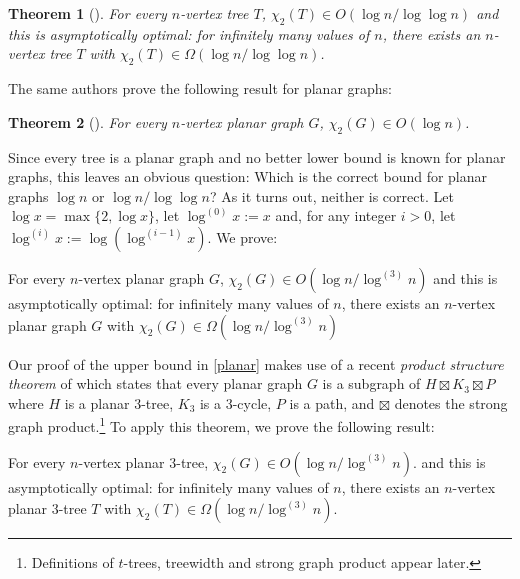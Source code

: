 \documentclass[kpfonts]{patmorin}
\newcommand{\uqs}{\chi_2}
\newtheorem{othertheorem}{Theorem}
\theoremstyle{named}
\begin{document}
\setcounter{othertheorem}{19}
\begin{othertheorem}[\cite{karpas.neiman.ea:on}]\label{trees}
    For every $n$-vertex tree $T$, $\uqs(T)\in O(\log n/\log\log n)$ and this is asymptotically optimal: for infinitely many values of $n$, there exists an $n$-vertex tree $T$ with $\uqs(T)\in\Omega(\log n/\log\log n)$.
\end{othertheorem}

The same authors prove the following result for planar graphs:

\setcounter{othertheorem}{15}
\begin{othertheorem}[\cite{karpas.neiman.ea:on}]\label{planar-graphs}
    For every $n$-vertex planar graph $G$, $\uqs(G)\in O(\log n)$.
\end{othertheorem}

Since every tree is a planar graph and no better lower bound is known for planar graphs, this leaves an obvious question:  Which is the correct bound for planar graphs $\log n$ or $\log n/\log\log n$?  As it turns out, neither is correct.  Let $\log x =\max\{2,\log x\}$, let $\log^{(0)}x:=x$ and, for any integer $i>0$, let $\log^{(i)}x:=\log(\log^{(i-1)} x)$. We prove:


\begin{thm}\label{planar}
    For every $n$-vertex planar graph $G$, $\uqs(G)\in O(\log n/\log^{(3)} n)$ and this is asymptotically optimal: for infinitely many values of $n$, there exists an $n$-vertex planar graph $G$ with $\uqs(G)\in \Omega(\log n/\log^{(3)} n)$
\end{thm}

Our proof of the upper bound in \cref{planar} makes use of a recent \emph{product structure theorem} of \citet{dujmovic.joret.ea:planar} which states that every planar graph $G$ is a subgraph of $H\boxtimes K_3\boxtimes P$ where $H$ is a planar $3$-tree, $K_3$ is a 3-cycle, $P$ is a path, and $\boxtimes$ denotes the strong graph product.\footnote{Definitions of $t$-trees, treewidth and strong graph product appear later.}  To apply this theorem, we prove the following result:

\begin{thm}\label{three-trees}
    For every $n$-vertex planar $3$-tree, $\uqs(G) \in O(\log n/\log^{(3)}n)$.
    and this is asymptotically optimal: for infinitely many values of $n$, there exists an $n$-vertex planar $3$-tree $T$ with $\uqs(T)\in\Omega(\log n/\log^{(3)} n)$.
\end{thm}
\end{document}
